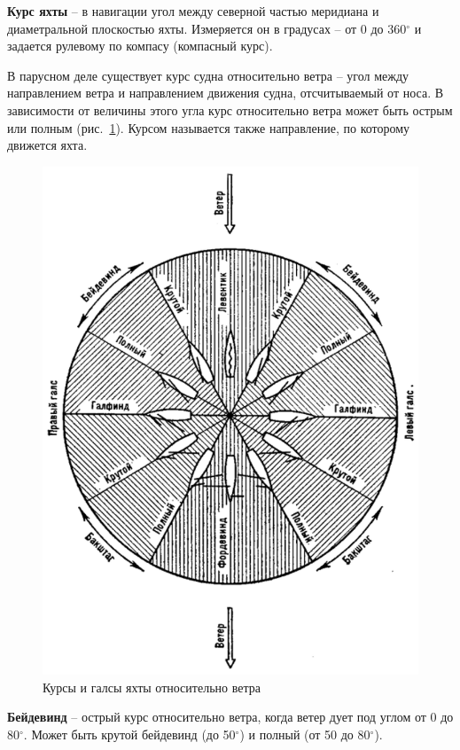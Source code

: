 \documentclass[a4paper, 12pt, twoside, final]{scrbook}
\begin{document}
\textbf{Курс яхты} \--- в навигации угол между северной частью меридиана и диаметральной плоскостью яхты. Измеряется он в градусах \--- от 0 до 360$^\circ$ и задается рулевому по компасу (компасный курс).

В парусном деле существует курс судна относительно ветра \--- угол между направлением ветра и направлением движения судна, отсчитываемый от носа. В зависимости от величины этого угла курс относительно ветра может быть острым или полным (рис.~\ref{fig:101}). Курсом называется также направление, по которому движется яхта.

\begin{figure}[htbp]
   \centering
   \includegraphics{101_Kursy_i_galsy} %
   \caption{Курсы и галсы яхты относительно ветра}
   \label{fig:101}
\end{figure}

\textbf{Бейдевинд} \--- острый курс относительно ветра, когда ветер дует под углом от 0 до 80$^\circ$. Может быть крутой бейдевинд (до 50$^\circ$) и полный (от 50 до 80$^\circ$).
\end{document}
